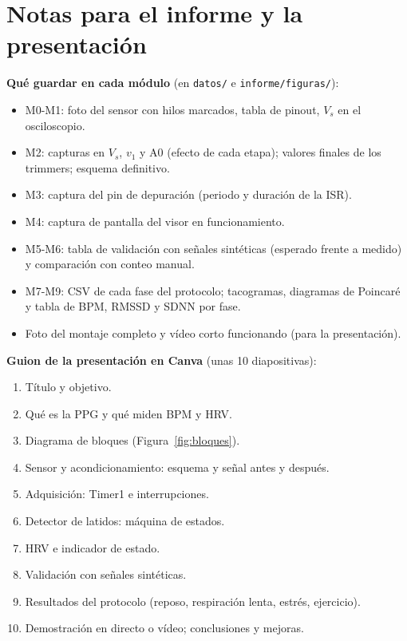 \documentclass[11pt,a4paper]{article}
\begin{document}
\section{Notas para el informe y la presentación}

\textbf{Qué guardar en cada módulo} (en \texttt{datos/} e \texttt{informe/figuras/}):
\begin{itemize}[leftmargin=1.2em,itemsep=2pt,topsep=2pt]
  \item M0-M1: foto del sensor con hilos marcados, tabla de pinout, $V_s$ en el osciloscopio.
  \item M2: capturas en $V_s$, $v_1$ y A0 (efecto de cada etapa); valores finales de los
        trimmers; esquema definitivo.
  \item M3: captura del pin de depuración (periodo y duración de la ISR).
  \item M4: captura de pantalla del visor en funcionamiento.
  \item M5-M6: tabla de validación con señales sintéticas (esperado frente a medido) y
        comparación con conteo manual.
  \item M7-M9: CSV de cada fase del protocolo; tacogramas, diagramas de Poincaré y tabla de
        BPM, RMSSD y SDNN por fase.
  \item Foto del montaje completo y vídeo corto funcionando (para la presentación).
\end{itemize}

\textbf{Guion de la presentación en Canva} (unas 10 diapositivas):
\begin{enumerate}[leftmargin=1.4em,itemsep=1pt,topsep=2pt]
  \item Título y objetivo.
  \item Qué es la PPG y qué miden BPM y HRV.
  \item Diagrama de bloques (Figura~\ref{fig:bloques}).
  \item Sensor y acondicionamiento: esquema y señal antes y después.
  \item Adquisición: Timer1 e interrupciones.
  \item Detector de latidos: máquina de estados.
  \item HRV e indicador de estado.
  \item Validación con señales sintéticas.
  \item Resultados del protocolo (reposo, respiración lenta, estrés, ejercicio).
  \item Demostración en directo o vídeo; conclusiones y mejoras.
\end{enumerate}
\end{document}
